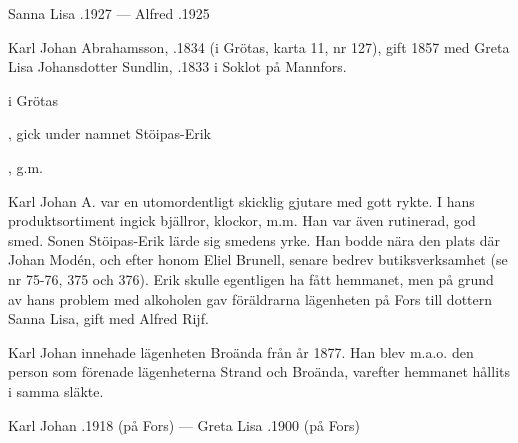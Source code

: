 Sanna Lisa .1927  ---  Alfred .1925





Karl Johan Abrahamsson, .1834 (i Grötas, karta 11, nr 127), gift 1857 med Greta Lisa Johansdotter Sundlin, .1833 i Soklot på Mannfors.
\begin{jhchildren}
  \item {} i Grötas
  \item {}
  \item {}, gick under namnet Stöipas-Erik
  \item {}
  \item {}
  \item {}, g.m. 
\end{jhchildren}

Karl Johan A. var en utomordentligt skicklig gjutare med gott rykte. I hans produktsortiment ingick bjällror, klockor, m.m. Han var även rutinerad, god smed. Sonen Stöipas-Erik lärde sig smedens yrke. Han bodde nära den plats där Johan Modén, och efter honom Eliel Brunell, senare bedrev butiksverksamhet (se nr 75-76, 375 och 376). Erik skulle egentligen ha fått hemmanet, men på grund av hans problem med alkoholen gav föräldrarna lägenheten på Fors till dottern Sanna Lisa, gift med Alfred Rijf.

Karl Johan innehade lägenheten Broända från år 1877. Han blev m.a.o. den person som förenade lägenheterna Strand och Broända, varefter hemmanet hållits i samma släkte.

Karl Johan .1918 (på Fors)  ---  Greta Lisa .1900 (på Fors)






